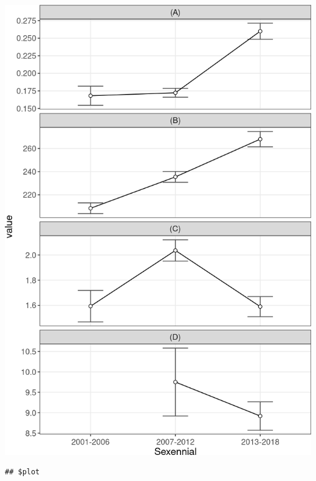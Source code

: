 \documentclass[10pt,landscape,a3paper]{article}
\begin{document}
\begin{center}\includegraphics{img/modelling/aa-eda-ts-17} \end{center}

\begin{verbatim}
## $plot
\end{verbatim}
\end{document}

